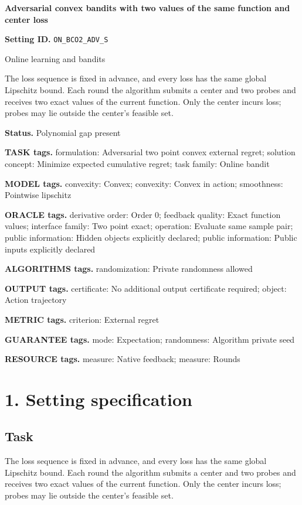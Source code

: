 \documentclass[10pt,a4paper]{article}
\begin{document}
\raggedright

{\LARGE\bfseries\sffamily\color{AtlasNavy} Adversarial convex bandits with two values of the same function and center loss\par}\vspace{5pt}
\textbf{Setting ID.} \texttt{ON\_\allowbreak{}BCO2\_\allowbreak{}ADV\_\allowbreak{}S}

Online learning and bandits

The loss sequence is fixed in advance, and every loss has the same global Lipschitz bound. Each round the algorithm submits a center and two probes and receives two exact values of the current function. Only the center incurs loss; probes may lie outside the center's feasible set.

\textbf{Status.} Polynomial gap present

\textbf{TASK tags.} formulation: Adversarial two point convex external regret; solution concept: Minimize expected cumulative regret; task family: Online bandit

\textbf{MODEL tags.} convexity: Convex; convexity: Convex in action; smoothness: Pointwise lipschitz

\textbf{ORACLE tags.} derivative order: Order 0; feedback quality: Exact function values; interface family: Two point exact; operation: Evaluate same sample pair; public information: Hidden objects explicitly declared; public information: Public inputs explicitly declared

\textbf{ALGORITHMS tags.} randomization: Private randomness allowed

\textbf{OUTPUT tags.} certificate: No additional output certificate required; object: Action trajectory

\textbf{METRIC tags.} criterion: External regret

\textbf{GUARANTEE tags.} mode: Expectation; randomness: Algorithm private seed

\textbf{RESOURCE tags.} measure: Native feedback; measure: Rounds

\section{1. Setting specification}
\subsection{Task}
The loss sequence is fixed in advance, and every loss has the same global Lipschitz bound. Each round the algorithm submits a center and two probes and receives two exact values of the current function. Only the center incurs loss; probes may lie outside the center's feasible set.
\end{document}
